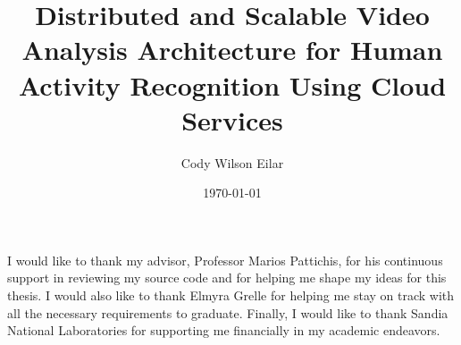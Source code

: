 \documentclass[botnum, fleqn, final]{unmeethesis}
\begin{document}
  \frontmatter



  \title{Distributed and Scalable Video Analysis Architecture
  for Human Activity Recognition Using Cloud Services}

  \author{Cody Wilson Eilar}
  \date{\monthyeardate\today}

  \maketitle



  \begin{acknowledgments}
    \vspace{1.1in}
    I would like to thank my advisor, Professor Marios Pattichis, for his
    continuous support in reviewing my source code and for helping me shape my
    ideas for this thesis. I would also like to thank Elmyra Grelle for helping
    me stay on track with all the necessary requirements to graduate. Finally, I
    would like to thank Sandia National Laboratories for supporting me
    financially in my academic endeavors.
  \end{acknowledgments}

  \maketitleabstract %
\end{document}
